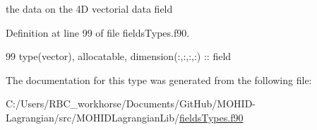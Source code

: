 the data on the 4D vectorial data field 



Definition at line 99 of file fields\+Types.\+f90.


\begin{DoxyCode}
99         \textcolor{keywordtype}{type}(vector), \textcolor{keywordtype}{allocatable}, \textcolor{keywordtype}{dimension(:,:,:,:)} :: field
\end{DoxyCode}


The documentation for this type was generated from the following file\+:\begin{DoxyCompactItemize}
\item 
C\+:/\+Users/\+R\+B\+C\+\_\+workhorse/\+Documents/\+Git\+Hub/\+M\+O\+H\+I\+D-\/\+Lagrangian/src/\+M\+O\+H\+I\+D\+Lagrangian\+Lib/\mbox{\hyperlink{fields_types_8f90}{fields\+Types.\+f90}}\end{DoxyCompactItemize}
